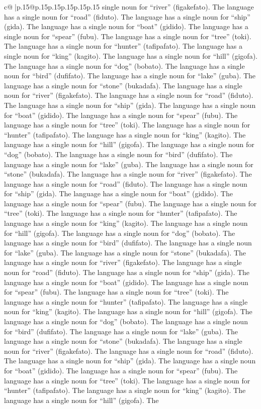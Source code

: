 \documentclass{article}
\begin{document}
{\begin{supertabular}{c@{$\;$}|p{.15\linewidth}@{}p{.15\linewidth}p{.15\linewidth}p{.15\linewidth}p{.15\linewidth}p{.15\linewidth}}
{{{single noun for “river” (figakefato). The language has a single noun for “road” (fiduto). The language has a single noun for “ship” (gida). The language has a single noun for “boat” (gidido). The language has a single noun for “spear” (fubu). The language has a single noun for “tree” (toki). The language has a single noun for “hunter” (tafipafato). The language has a single noun for “king” (kagito). The language has a single noun for “hill” (gigofa). The language has a single noun for “dog” (bobato). The language has a single noun for “bird” (dufifato). The language has a single noun for “lake” (guba). The language has a single noun for “stone” (bukadafa). The language has a single noun for “river” (figakefato). The language has a single noun for “road” (fiduto). The language has a single noun for “ship” (gida). The language has a single noun for “boat” (gidido). The language has a single noun for “spear” (fubu). The language has a single noun for “tree” (toki). The language has a single noun for “hunter” (tafipafato). The language has a single noun for “king” (kagito). The language has a single noun for “hill” (gigofa). The language has a single noun for “dog” (bobato). The language has a single noun for “bird” (dufifato). The language has a single noun for “lake” (guba). The language has a single noun for “stone” (bukadafa). The language has a single noun for “river” (figakefato). The language has a single noun for “road” (fiduto). The language has a single noun for “ship” (gida). The language has a single noun for “boat” (gidido). The language has a single noun for “spear” (fubu). The language has a single noun for “tree” (toki). The language has a single noun for “hunter” (tafipafato). The language has a single noun for “king” (kagito). The language has a single noun for “hill” (gigofa). The language has a single noun for “dog” (bobato). The language has a single noun for “bird” (dufifato). The language has a single noun for “lake” (guba). The language has a single noun for “stone” (bukadafa). The language has a single noun for “river” (figakefato). The language has a single noun for “road” (fiduto). The language has a single noun for “ship” (gida). The language has a single noun for “boat” (gidido). The language has a single noun for “spear” (fubu). The language has a single noun for “tree” (toki). The language has a single noun for “hunter” (tafipafato). The language has a single noun for “king” (kagito). The language has a single noun for “hill” (gigofa). The language has a single noun for “dog” (bobato). The language has a single noun for “bird” (dufifato). The language has a single noun for “lake” (guba). The language has a single noun for “stone” (bukadafa). The language has a single noun for “river” (figakefato). The language has a single noun for “road” (fiduto). The language has a single noun for “ship” (gida). The language has a single noun for “boat” (gidido). The language has a single noun for “spear” (fubu). The language has a single noun for “tree” (toki). The language has a single noun for “hunter” (tafipafato). The language has a single noun for “king” (kagito). The language has a single noun for “hill” (gigofa). The }}}
\end{supertabular}}
\end{document}
